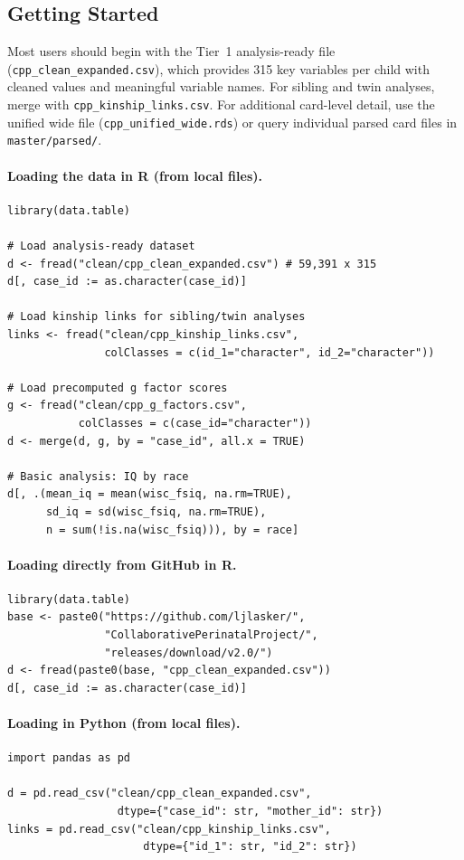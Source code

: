 \documentclass[12pt]{article}
\begin{document}
\subsection{Getting Started}

Most users should begin with the Tier~1 analysis-ready file (\texttt{cpp\_clean\_expanded.csv}), which provides 315 key variables per child with cleaned values and meaningful variable names. For sibling and twin analyses, merge with \texttt{cpp\_kinship\_links.csv}. For additional card-level detail, use the unified wide file (\texttt{cpp\_unified\_wide.rds}) or query individual parsed card files in \texttt{master/parsed/}.

\paragraph{Loading the data in R (from local files).}
\begin{verbatim}
library(data.table)

# Load analysis-ready dataset
d <- fread("clean/cpp_clean_expanded.csv") # 59,391 x 315
d[, case_id := as.character(case_id)]

# Load kinship links for sibling/twin analyses
links <- fread("clean/cpp_kinship_links.csv",
               colClasses = c(id_1="character", id_2="character"))

# Load precomputed g factor scores
g <- fread("clean/cpp_g_factors.csv",
           colClasses = c(case_id="character"))
d <- merge(d, g, by = "case_id", all.x = TRUE)

# Basic analysis: IQ by race
d[, .(mean_iq = mean(wisc_fsiq, na.rm=TRUE),
      sd_iq = sd(wisc_fsiq, na.rm=TRUE),
      n = sum(!is.na(wisc_fsiq))), by = race]
\end{verbatim}

\paragraph{Loading directly from GitHub in R.}
\begin{verbatim}
library(data.table)
base <- paste0("https://github.com/ljlasker/",
               "CollaborativePerinatalProject/",
               "releases/download/v2.0/")
d <- fread(paste0(base, "cpp_clean_expanded.csv"))
d[, case_id := as.character(case_id)]
\end{verbatim}

\paragraph{Loading in Python (from local files).}
\begin{verbatim}
import pandas as pd

d = pd.read_csv("clean/cpp_clean_expanded.csv",
                 dtype={"case_id": str, "mother_id": str})
links = pd.read_csv("clean/cpp_kinship_links.csv",
                     dtype={"id_1": str, "id_2": str})
\end{verbatim}
\end{document}
